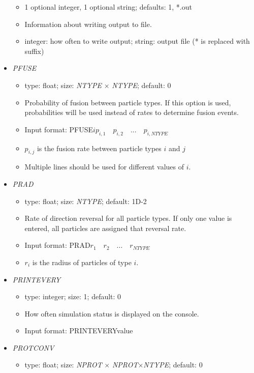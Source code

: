 \documentclass[12pt]{article}
\begin{document}
\begin{itemize}
\begin{itemize}
	\item 1 optional integer, 1 optional string; defaults: 1, *.out
	\item Information about writing output to file.
	\item integer: how often to write output; string: output file (* is replaced with suffix)
\end{itemize}
%
\item {\it PFUSE}
\begin{itemize}
	\item  type: float; size: \textit{NTYPE} $\times$ \textit{NTYPE}; default: 0
	\item Probability of fusion between particle types. If this option is used, probabilities will be used instead of rates to determine fusion events.
	\item Input format: PFUSE\quad$i$\quad$p_{i,1}\quad p_{i,2}\quad...\quad p_{i,NTYPE}$
	\item $p_{i,j}$ is the fusion rate between particle types $i$ and $j$
	\item Multiple lines should be used for different values of $i$.
\end{itemize}
%
\item {\it PRAD}
\begin{itemize}
	\item  type: float; size: \textit{NTYPE}; default: 1D-2
	\item Rate of direction reversal for all particle types. If only one value is entered, all particles are assigned that reversal rate. 
	\item Input format: PRAD\quad$r_{1}\quad r_{2}\quad...\quad r_{NTYPE}$
	\item $r_{i}$ is the radius of particles of type $i$.
\end{itemize}
%
\item {\it PRINTEVERY}
\begin{itemize}
	\item  type: integer; size: 1; default: 0
	\item How often simulation status is displayed on the console.
	\item Input format: PRINTEVERY\quad value
\end{itemize}
%
\item {\it PROTCONV}
\begin{itemize}
	\item  type: float; size: \textit{NPROT} $\times$ \textit{NPROT}$\times$\textit{NTYPE}; default: 0

\end{itemize}
\end{itemize}
\end{document}
